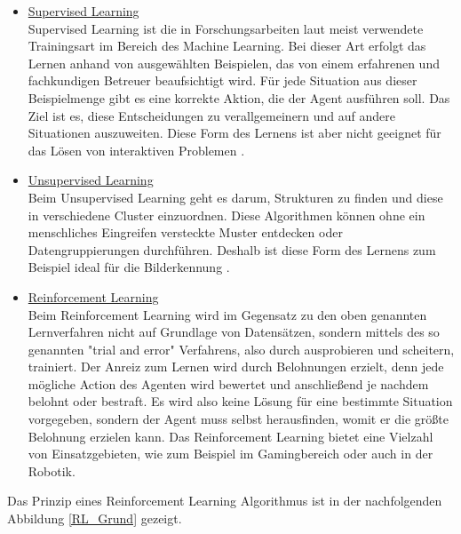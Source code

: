 \begin{itemize}
\item \underline{Supervised Learning} \\
Supervised Learning ist die in Forschungsarbeiten laut \cite{sutton2018reinforcement} meist verwendete Trainingsart im Bereich des Machine Learning. Bei dieser Art erfolgt das Lernen anhand von ausgewählten Beispielen, das von einem erfahrenen und fachkundigen Betreuer beaufsichtigt wird. Für jede Situation aus dieser Beispielmenge gibt es eine korrekte Aktion, die der Agent ausführen soll. Das Ziel ist es, diese Entscheidungen zu verallgemeinern und auf andere Situationen auszuweiten. Diese Form des Lernens ist aber nicht geeignet für das Lösen von interaktiven Problemen \cite{sutton2018reinforcement}. \\


\item \underline{Unsupervised Learning} \\
Beim Unsupervised Learning geht es darum, Strukturen zu finden und diese in verschiedene Cluster einzuordnen. Diese Algorithmen können ohne ein menschliches Eingreifen versteckte Muster entdecken oder Datengruppierungen durchführen. Deshalb ist diese Form des Lernens zum Beispiel ideal für die Bilderkennung \cite{IBM2}.\\

\item \underline{Reinforcement Learning} \\
Beim Reinforcement Learning wird im Gegensatz zu den oben genannten Lernverfahren nicht auf Grundlage von Datensätzen, sondern mittels des so genannten "trial and error" Verfahrens, also durch ausprobieren und scheitern, trainiert. Der Anreiz zum Lernen wird durch Belohnungen erzielt, denn jede mögliche Action des Agenten wird bewertet und anschließend je nachdem belohnt oder bestraft. Es wird also keine Lösung für eine bestimmte Situation vorgegeben, sondern der Agent muss selbst herausfinden, womit er die größte Belohnung erzielen kann. Das Reinforcement Learning bietet eine Vielzahl von Einsatzgebieten, wie zum Beispiel im Gamingbereich oder auch in der Robotik.\\
\end{itemize}

Das Prinzip eines Reinforcement Learning Algorithmus ist in der nachfolgenden Abbildung \ref{RL_Grund} gezeigt.


